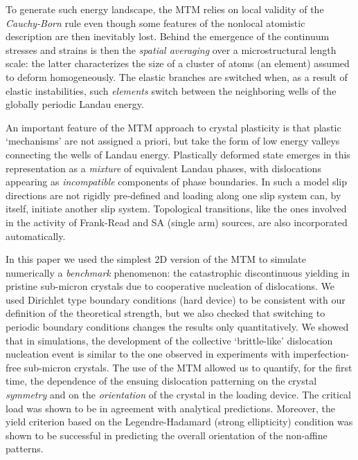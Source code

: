 \documentclass[CRPHYS,Unicode,manuscript]{cedram}
\begin{document}

To generate such  energy landscape, the  MTM relies on  local validity of the  \emph{Cauchy-Born} rule  even though some features of the nonlocal atomistic  description are then  inevitably lost. Behind the emergence of the continuum stresses and strains is then the  \emph{spatial averaging} over a microstructural length scale: the latter   characterizes the size of a   cluster of atoms  (an element) assumed to   deform   homogeneously.   The elastic branches are switched  when, as a result  of elastic instabilities,  such  \emph{elements}  switch between the neighboring wells of the globally periodic Landau  energy.

An important feature of the MTM approach to crystal plasticity is that  plastic `mechanisms' are not assigned a priori, but take the form of low energy valleys  connecting the  wells of Landau energy. Plastically deformed state emerges in this representation
as a \emph{mixture} of equivalent Landau phases, with dislocations appearing as \emph{incompatible }components of phase boundaries.  In such  a model slip directions are not rigidly pre-defined and loading along one slip system  can, by itself,  initiate another slip system. Topological transitions, like the ones involved in the activity of Frank-Read and  SA  (single arm) sources, are also incorporated  automatically.

In this  paper we used the simplest  2D version of the MTM   to simulate numerically  a  \emph{benchmark} phenomenon:  the catastrophic discontinuous yielding   in pristine sub-micron crystals due to  cooperative nucleation of dislocations. We used Dirichlet type  boundary conditions (hard device) to be consistent with our definition of the theoretical strength, but we also checked that switching to periodic boundary conditions   changes the results only quantitatively.
We  showed that  in  simulations, the development of the collective  `brittle-like' dislocation nucleation event is similar to  the one  observed in  experiments  with imperfection-free sub-micron crystals. The use of the MTM allowed us   to  quantify, for the first time, the dependence of  the ensuing dislocation patterning  on the crystal \emph{symmetry} and on the \emph{orientation} of the crystal in the loading device.  The critical load was shown to be in agreement  with  analytical predictions.    Moreover,  the  yield criterion  based on the  Legendre-Hadamard   (strong ellipticity) condition was shown to be successful  in predicting  the  overall orientation  of the non-affine patterns.  
\end{document}
